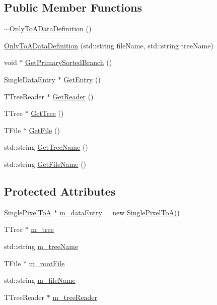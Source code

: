 \subsection*{Public Member Functions}
\begin{DoxyCompactItemize}
\item 
\hyperlink{classOnlyToADataDefinition_ac3392db2f04c84cfce35bbf12f287357}{$\sim$\+Only\+To\+A\+Data\+Definition} ()
\item 
\hyperlink{classOnlyToADataDefinition_aee47039c5d1c4c8714815e0253fca3e3}{Only\+To\+A\+Data\+Definition} (std\+::string file\+Name, std\+::string tree\+Name)
\item 
void $\ast$ \hyperlink{classOnlyToADataDefinition_af2025f39b59dc8bd50a281f5034ed47a}{Get\+Primary\+Sorted\+Branch} ()
\item 
\hyperlink{classSingleDataEntry}{Single\+Data\+Entry} $\ast$ \hyperlink{classOnlyToADataDefinition_ab2f4346c01cf342390c392cf1e36eebe}{Get\+Entry} ()
\item 
T\+Tree\+Reader $\ast$ \hyperlink{classRootDataDefinition_a48a885b44c954506728f71f07d927506}{Get\+Reader} ()
\item 
T\+Tree $\ast$ \hyperlink{classRootDataDefinition_a20ed89d6d2483a0f76cd2fb131fcc597}{Get\+Tree} ()
\item 
T\+File $\ast$ \hyperlink{classRootDataDefinition_ab26897ffdd1de5e6572f6067770066b3}{Get\+File} ()
\item 
std\+::string \hyperlink{classRootDataDefinition_acc7728b0a9315cacc6b9c1fae38ed490}{Get\+Tree\+Name} ()
\item 
std\+::string \hyperlink{classRootDataDefinition_a56f206839275fdf5af290b372c4d7e13}{Get\+File\+Name} ()
\end{DoxyCompactItemize}
\subsection*{Protected Attributes}
\begin{DoxyCompactItemize}
\item 
\hyperlink{classSinglePixelToA}{Single\+Pixel\+To\+A} $\ast$ \hyperlink{classOnlyToADataDefinition_abb0a23c47fcf037c042e8529163a1e31}{m\+\_\+data\+Entry} = new \hyperlink{classSinglePixelToA}{Single\+Pixel\+To\+A}()
\item 
T\+Tree $\ast$ \hyperlink{classRootDataDefinition_a941ec585a2aa533bc30889a382e54f50}{m\+\_\+tree}
\item 
std\+::string \hyperlink{classRootDataDefinition_a46394bbb1863baa4abcd8cbd0413fa88}{m\+\_\+tree\+Name}
\item 
T\+File $\ast$ \hyperlink{classRootDataDefinition_af00a892a1b940abf9265066391b67304}{m\+\_\+root\+File}
\item 
std\+::string \hyperlink{classRootDataDefinition_a03154139db8613ec02cd57fd84d8c0e8}{m\+\_\+file\+Name}
\item 
T\+Tree\+Reader $\ast$ \hyperlink{classRootDataDefinition_a919827bdd245e61c0f54676d59cc7448}{m\+\_\+tree\+Reader}
\end{DoxyCompactItemize}


